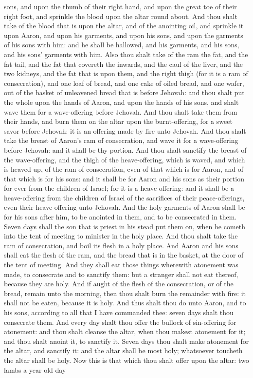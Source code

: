 sons, and upon the thumb of their right hand, and upon the great toe of their right foot, and sprinkle the blood upon the altar round about. And thou shalt take of the blood that is upon the altar, and of the anointing oil, and sprinkle it upon Aaron, and upon his garments, and upon his sons, and upon the garments of his sons with him: and he shall be hallowed, and his garments, and his sons, and his sons’ garments with him. Also thou shalt take of the ram the fat, and the fat tail, and the fat that covereth the inwards, and the caul of the liver, and the two kidneys, and the fat that is upon them, and the right thigh (for it is a ram of consecration), and one loaf of bread, and one cake of oiled bread, and one wafer, out of the basket of unleavened bread that is before Jehovah: and thou shalt put the whole upon the hands of Aaron, and upon the hands of his sons, and shalt wave them for a wave-offering before Jehovah. And thou shalt take them from their hands, and burn them on the altar upon the burnt-offering, for a sweet savor before Jehovah: it is an offering made by fire unto Jehovah.  And thou shalt take the breast of Aaron’s ram of consecration, and wave it for a wave-offering before Jehovah: and it shall be thy portion. And thou shalt sanctify the breast of the wave-offering, and the thigh of the heave-offering, which is waved, and which is heaved up, of the ram of consecration, even of that which is for Aaron, and of that which is for his sons: and it shall be for Aaron and his sons as their portion for ever from the children of Israel; for it is a heave-offering: and it shall be a heave-offering from the children of Israel of the sacrifices of their peace-offerings, even their heave-offering unto Jehovah.  And the holy garments of Aaron shall be for his sons after him, to be anointed in them, and to be consecrated in them. Seven days shall the son that is priest in his stead put them on, when he cometh into the tent of meeting to minister in the holy place.  And thou shalt take the ram of consecration, and boil its flesh in a holy place. And Aaron and his sons shall eat the flesh of the ram, and the bread that is in the basket, at the door of the tent of meeting. And they shall eat those things wherewith atonement was made, to consecrate and to sanctify them: but a stranger shall not eat thereof, because they are holy. And if aught of the flesh of the consecration, or of the bread, remain unto the morning, then thou shalt burn the remainder with fire: it shall not be eaten, because it is holy.  And thus shalt thou do unto Aaron, and to his sons, according to all that I have commanded thee: seven days shalt thou consecrate them. And every day shalt thou offer the bullock of sin-offering for atonement: and thou shalt cleanse the altar, when thou makest atonement for it; and thou shalt anoint it, to sanctify it. Seven days thou shalt make atonement for the altar, and sanctify it: and the altar shall be most holy; whatsoever toucheth the altar shall be holy.  Now this is that which thou shalt offer upon the altar: two lambs a year old day 